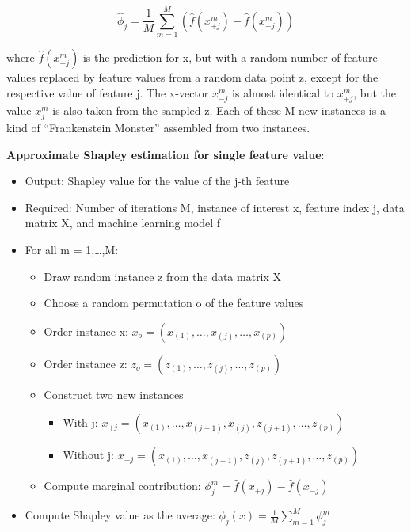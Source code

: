 \documentclass[12pt,]{krantz}
\providecommand{\tightlist}{%
  \setlength{\itemsep}{0pt}\setlength{\parskip}{0pt}}
\begin{document}
\[\hat{\phi}_{j}=\frac{1}{M}\sum_{m=1}^M\left(\hat{f}(x^{m}_{+j})-\hat{f}(x^{m}_{-j})\right)\]

where \(\hat{f}(x^{m}_{+j})\) is the prediction for x, but with a random
number of feature values replaced by feature values from a random data
point z, except for the respective value of feature j. The x-vector
\(x^{m}_{-j}\) is almost identical to \(x^{m}_{+j}\), but the value
\(x_j^{m}\) is also taken from the sampled z. Each of these M new
instances is a kind of ``Frankenstein Monster'' assembled from two
instances.

\textbf{Approximate Shapley estimation for single feature value}:

\begin{itemize}
\tightlist
\item
  Output: Shapley value for the value of the j-th feature
\item
  Required: Number of iterations M, instance of interest x, feature
  index j, data matrix X, and machine learning model f
\item
  For all m = 1,\ldots{},M:

  \begin{itemize}
  \tightlist
  \item
    Draw random instance z from the data matrix X
  \item
    Choose a random permutation o of the feature values
  \item
    Order instance x: \(x_o=(x_{(1)},\ldots,x_{(j)},\ldots,x_{(p)})\)
  \item
    Order instance z: \(z_o=(z_{(1)},\ldots,z_{(j)},\ldots,z_{(p)})\)
  \item
    Construct two new instances

    \begin{itemize}
    \tightlist
    \item
      With j:
      \(x_{+j}=(x_{(1)},\ldots,x_{(j-1)},x_{(j)},z_{(j+1)},\ldots,z_{(p)})\)
    \item
      Without j:
      \(x_{-j}=(x_{(1)},\ldots,x_{(j-1)},z_{(j)},z_{(j+1)},\ldots,z_{(p)})\)
    \end{itemize}
  \item
    Compute marginal contribution:
    \(\phi_j^{m}=\hat{f}(x_{+j})-\hat{f}(x_{-j})\)
  \end{itemize}
\item
  Compute Shapley value as the average:
  \(\phi_j(x)=\frac{1}{M}\sum_{m=1}^M\phi_j^{m}\)
\end{itemize}
\end{document}
